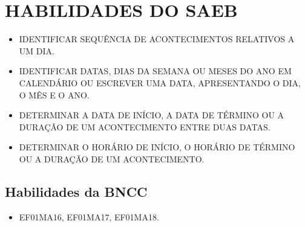 
\section*{HABILIDADES DO SAEB}

\begin{itemize}
\item \uppercase{Identificar sequência de acontecimentos relativos a um dia.}
\item \uppercase{Identificar datas, dias da semana ou meses do ano em calendário ou
escrever uma data, apresentando o dia, o mês e o ano.}
\item \uppercase{Determinar a data de início, a data de término ou a duração de um
acontecimento entre duas datas.}
\item \uppercase{Determinar o horário de início, o horário de término ou a duração de
um acontecimento.}
\end{itemize}

\subsection{Habilidades da BNCC}

\begin{itemize}\enlargethispage{2\baselineskip}
\item EF01MA16, EF01MA17, EF01MA18.
\end{itemize}

